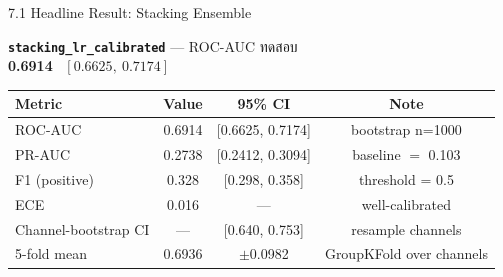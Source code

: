\documentclass[aspectratio=169,11pt,xcolor=dvipsnames]{beamer}
\newcommand{\hl}[1]{\textcolor{kmitlOrange}{\textbf{#1}}}
\begin{document}
\begin{frame}{7.1 Headline Result: Stacking Ensemble}
  \begin{center}
    \Large
    \hl{\texttt{stacking\_lr\_calibrated}} — ROC-AUC ทดสอบ \\[0.3em]
    \Huge
    \hl{0.6914} \ {\large $[0.6625,\ 0.7174]$}
  \end{center}
  \vspace{0.4em}
  \begin{center}
    \begin{tabular}{lccc}
      \toprule
      \textbf{Metric} & \textbf{Value} & \textbf{95\% CI} & \textbf{Note}\\
      \midrule
      ROC-AUC & 0.6914 & [0.6625, 0.7174] & bootstrap n=1000\\
      PR-AUC  & 0.2738 & [0.2412, 0.3094] & baseline $=$ 0.103\\
      F1 (positive) & 0.328 & [0.298, 0.358] & threshold = 0.5\\
      ECE     & 0.016  & ---              & well-calibrated\\
      Channel-bootstrap CI & ---  & [0.640, 0.753]  & resample channels\\
      5-fold mean & 0.6936 & $\pm$0.0982 & GroupKFold over channels\\
      \bottomrule
    \end{tabular}
  \end{center}
\end{frame}
\end{document}
